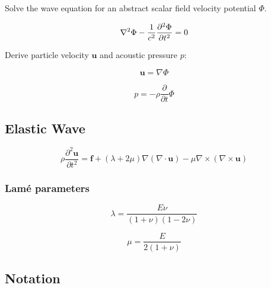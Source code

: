 \documentclass[a4paper,10pt]{book}
\begin{document}
    Solve the wave equation for an abstract scalar field velocity potential $\Phi$.

    \begin{equation}
    \nabla ^2 \Phi - {1 \over c^2} { \partial^2 \Phi  \over  \partial t ^2 } = 0
    \end{equation}

    Derive particle velocity $\mathbf{u}$ and acoustic pressure $p$:

    \begin{equation}
    \mathbf{u}=\nabla\Phi
    \end{equation}

    \begin{equation}
    p=-\rho\frac{\partial}{\partial{t}}\Phi
    \end{equation}

\subsection{Elastic Wave}

    \begin{equation}
    \rho\frac{\partial^2\mathbf{u}}{\partial{t}^2}=
    \mathbf{f}+\left(\lambda+2\mu\right)\nabla\left(\nabla\cdot\mathbf{u}\right)-
    \mu\nabla\times\left(\nabla\times\mathbf{u}\right)
    \end{equation}

\subsubsection{Lam\'{e} parameters}

    \begin{equation}
    \lambda=\frac{E\nu}{\left(1+\nu\right)\left(1-2\nu\right)}
    \end{equation}

    \begin{equation}
    \mu=\frac{E}{2\left(1+\nu\right)}
    \end{equation}

\subsection{Notation}
\end{document}
